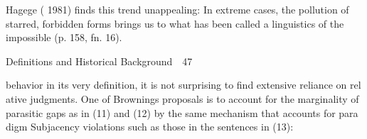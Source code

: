 \setcounter{listWWNumlxleveli}{14}
\begin{listWWNumlxleveli}
\item 
\begin{styleStandard}
Hagege ( 1981) finds this trend unappealing: {\textquotedbl}In extreme cases, the pollution of starred, forbidden forms brings us to what has been called {\textquotesingle}a linguistics of the impossible{\textquotedbl}{\textquotesingle} (p. 158, fn. 16).
\end{styleStandard}


\end{listWWNumlxleveli}
\clearpage\setcounter{page}{1}\begin{styleStandard}
Definitions and Historical Background\ \ 47
\end{styleStandard}


\begin{styleTextbody}
behavior in its very definition, it is not surprising to find extensive reliance on rel\- ative judgments. One of Browning{\textquotesingle}s proposals is to account for the marginality of parasitic gaps as in (11) and (12) by the same mechanism that accounts for para\- digm Subjacency violations such as those in the sentences in (13):
\end{styleTextbody}


